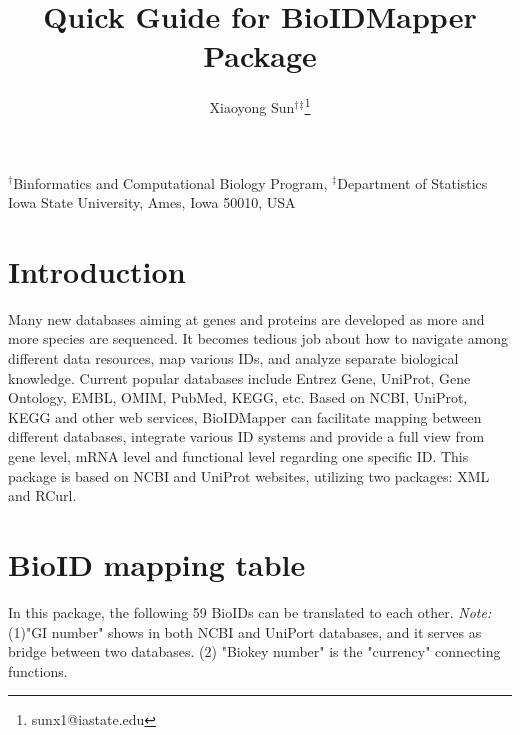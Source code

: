 \documentclass[a4paper]{article}
\author{Xiaoyong Sun$^\dagger$$^\ddagger$\footnote{sunx1@iastate.edu}}
\begin{document}

\title{Quick Guide for BioIDMapper Package}
\maketitle
\begin{center}$^\dagger$Binformatics and Computational Biology Program, $^\ddagger$Department of Statistics \\ Iowa State University, Ames, Iowa 50010, USA
\end{center}

\tableofcontents

\section{Introduction}
Many new databases aiming at genes and proteins are developed as more and more species are sequenced. It becomes tedious job about how to navigate among different data resources, map various IDs, and analyze separate biological knowledge.  Current popular databases include Entrez Gene, UniProt, Gene Ontology, EMBL, OMIM, PubMed, KEGG, etc. Based on NCBI, UniProt, KEGG and other web services,  BioIDMapper can facilitate mapping between different databases, integrate various ID systems and provide a full view from gene level, mRNA level and functional level regarding one specific ID. This package is based on NCBI and UniProt websites, utilizing two packages: XML and RCurl.

\section{BioID mapping table}
In this package, the following 59 BioIDs can be translated to each other. \newline \newline
\textit{Note:} \newline
(1)"GI number" shows in both NCBI and UniPort databases, and it serves
as bridge between two databases. \newline
(2) "Biokey number" is the "currency" connecting functions.\newline
\end{document}
